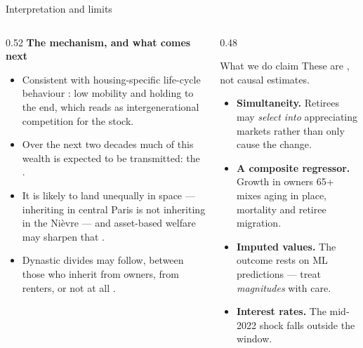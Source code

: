 \documentclass[aspectratio=169]{beamer}
\begin{document}
\begin{frame}{Interpretation and limits}
    \footnotesize
    \begin{columns}[T]
        \begin{column}{0.52\textwidth}
            \textbf{The mechanism, and what comes next}
            \begin{itemize}
                \item Consistent with housing-specific life-cycle behaviour
                      \citep{Yang2009_housing_life_cycle}: low mobility and
                      holding to the end, which
                      \citet{Simon2017_concurrence_generationnelle} reads as
                      intergenerational competition for the stock.
                \item Over the next two decades much of this wealth is expected
                      to be transmitted: the .
                \item It is likely to land unequally in space --- inheriting in
                      central Paris is not inheriting in the Nièvre
                      \citep{Coquard2019_ceux_qui_restent} --- and asset-based
                      welfare may sharpen that
                      \citep{LeGoix2025_more_volatile_less_equal}.
                \item Dynastic divides may follow, between those who inherit
                      from owners, from renters, or not at all
                      \citep{Cui2024_intergenerational_transfer}.
            \end{itemize}
        \end{column}
        \begin{column}{0.48\textwidth}
            \begin{block}{What we do  claim}
                These are , not causal
                estimates.
            \end{block}
            \begin{itemize}
                \item \textbf{Simultaneity.} Retirees may \emph{select into}
                      appreciating markets rather than only cause the change.
                \item \textbf{A composite regressor.} Growth in owners 65+ mixes
                      aging in place, mortality and retiree migration.
                \item \textbf{Imputed values.} The outcome rests on ML
                      predictions --- treat \emph{magnitudes} with care.
                \item \textbf{Interest rates.} The mid-2022 shock falls outside
                      the window.
            \end{itemize}
        \end{column}
    \end{columns}
\end{frame}
\end{document}
